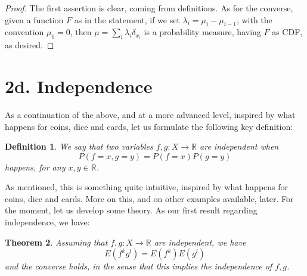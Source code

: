 \documentclass[12pt]{amsbook}
\newtheorem{theorem}{Theorem}[chapter]
\newtheorem{definition}[theorem]{Definition}
\begin{document}
\begin{proof}
The first assertion is clear, coming from definitions. As for the converse, given a function $F$ as in the statement, if we set $\lambda_i=\mu_i-\mu_{i-1}$, with the convention $\mu_0=0$, then $\mu=\sum_i\lambda_i\delta_{x_i}$ is a probability measure, having $F$ as CDF, as desired.
\end{proof}

\section*{2d. Independence}

As a continuation of the above, and at a more advanced level, inspired by what happens for coins, dice and cards, let us formulate the following key definition: 


\begin{definition}
We say that two variables $f,g:X\to\mathbb R$ are independent when
$$P(f=x,g=y)=P(f=x)P(g=y)$$
happens, for any $x,y\in\mathbb R$.
\end{definition}

As mentioned, this is something quite intuitive, inspired by what happens for coins, dice and cards. More on this, and on other examples available, later. For the moment, let us develop some theory. As our first result regarding independence, we have:


\begin{theorem}
Assuming that $f,g:X\to\mathbb R$ are independent, we have
$$E(f^kg^l)=E(f^k)E(g^l)$$
and the converse holds, in the sense that this implies the independence of $f,g$.
\end{theorem}
\end{document}

